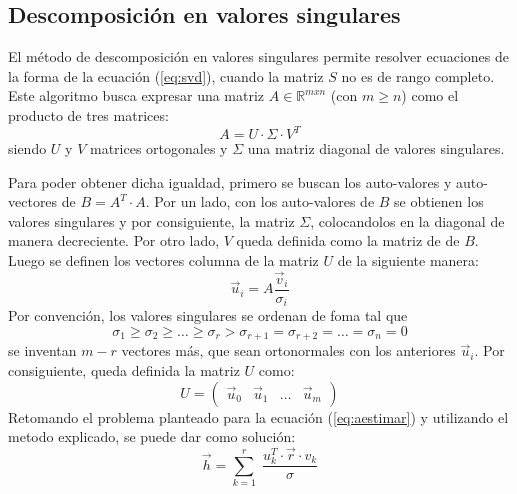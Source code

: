 \documentclass[a4paper]{article}
\begin{document}
 	 \subsection{Descomposición en valores singulares}
 	 	El método de descomposición en valores singulares permite resolver ecuaciones de la forma de la ecuación (\ref{eq:svd}), cuando la matriz $ S $ no es de rango completo.
 	 	Este algoritmo busca expresar una matriz $ A \in \mathbb{R}^{m x n}$ (con $ m \geq n $) como el producto de tres matrices:
 	 	\begin{equation}
 	 		A = U \cdot \Sigma \cdot V^{T}
 	 	\end{equation}
 	 	siendo $ U $ y $ V $ matrices ortogonales y $ \Sigma $ una matriz diagonal de valores singulares.\par
 	 	Para poder obtener dicha igualdad, primero se buscan los auto-valores y auto-vectores de $ B = A^{T} \cdot A $. Por un lado, con los auto-valores de $ B $ se obtienen los valores singulares y por consiguiente, la matriz $ \Sigma $, colocandolos en la diagonal de manera decreciente. Por otro lado, $ V $ queda definida como la matriz de  de $ B $.
 	 	Luego se  definen los vectores columna de la matriz $ U $ de la siguiente manera:
 	 	\begin{equation}
 	 		\vec{u}_{i} = A \frac{\vec{v}_{i}}{\sigma_{i}}
		\end{equation} 	 	
 	 	Por convención, los valores singulares se ordenan de foma tal que
 	 	\[ \sigma_{1} \geq \sigma_{2} \geq \ldots \geq \sigma_{r} > \sigma_{r+1} = \sigma_{r+2} = \ldots = \sigma_{n} = 0  \]
 	 	se inventan $ m - r $ vectores más, que sean ortonormales con los anteriores $ \vec{u}_{i} $. Por consiguiente, queda definida la matriz $ U $ como:
 	 	\[ 	U =  
 	 		\left( \begin{array}{llll}
				\vec{u}_{0} & \vec{u}_{1} & \ldots & \vec{u}_{m}
			\end{array} \right)			
		\]
		Retomando el problema planteado para la ecuación (\ref{eq:aestimar}) y utilizando el metodo explicado, se puede dar como solución:
		\begin{equation}
 	 		\vec{h} = \sum_{k=1}^{r} \; \frac{u_{k}^{T} \cdot \vec{r} \cdot v_{k}}{\sigma}
 	 	\end{equation}
\end{document}
